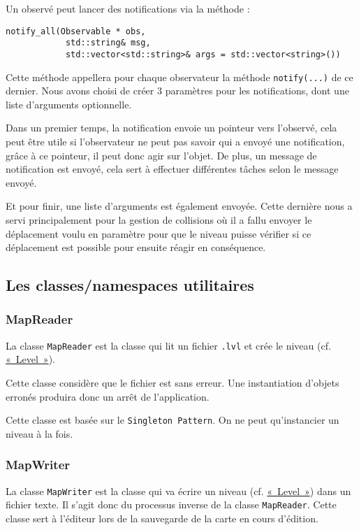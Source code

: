 \documentclass[]{report}
\begin{document}
Un observé peut lancer des notifications via la méthode :
\begin{lstlisting}
notify_all(Observable * obs, 
            std::string& msg, 
            std::vector<std::string>& args = std::vector<string>())
\end{lstlisting}

Cette méthode appellera pour chaque observateur la méthode \texttt{notify(...)} de ce dernier.
Nous avons choisi de créer 3 paramètres pour les notifications, dont une liste d'arguments optionnelle.

Dans un premier temps, la notification envoie un pointeur vers l'observé, cela peut être utile si l'observateur
ne peut pas savoir qui a envoyé une notification, grâce à ce pointeur, il peut donc agir sur l'objet. De plus, un message
de notification est envoyé, cela sert à effectuer différentes tâches selon le message envoyé.

Et pour finir, une liste d'arguments est également envoyée. Cette dernière nous a servi principalement pour la gestion
de collisions où il a fallu envoyer le déplacement voulu en paramètre pour que le niveau puisse vérifier si ce déplacement est
possible pour ensuite réagir en conséquence.

\subsection{Les classes/namespaces utilitaires}

\subsubsection{MapReader}

La classe \texttt{MapReader} est la classe qui lit un fichier \texttt{.lvl} 
et crée le niveau (cf. \hyperref[Level]{«~Level~»}).

Cette classe considère que le fichier est sans erreur. Une instantiation d'objets
erronés produira donc un arrêt de l'application.

Cette classe est basée sur le \texttt{Singleton Pattern}. On ne peut qu’instancier un niveau
à la fois.

\subsubsection{MapWriter}

La classe \texttt{MapWriter} est la classe qui va écrire un niveau (cf. \hyperref[Level]{«~Level~»}) 
dans un fichier texte. Il s’agit donc du processus inverse de la classe
\texttt{MapReader}. Cette classe sert à l’éditeur lors de la sauvegarde de la
carte en cours d’édition.
\end{document}
